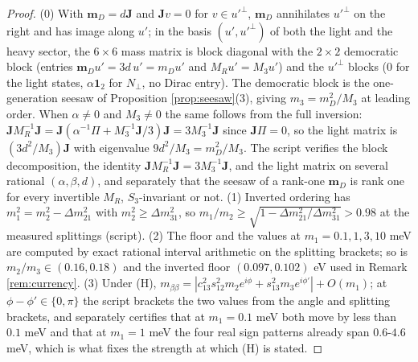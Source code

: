 \documentclass[11pt]{article}
\theoremstyle{definition}
\newcommand{\J}{\mathbf{J}}
\newcommand{\mD}{\mathbf{m}_{D}}
\begin{document}
\begin{proof}
(0) With $\mD = d\J$ and $\J v = 0$ for $v \in u'^{\perp}$, $\mD$ annihilates $u'^{\perp}$ on the right and has image along $u'$; in the basis $(u', u'^{\perp})$ of both the light and the heavy sector, the $6 \times 6$ mass matrix is block diagonal with the $2 \times 2$ democratic block (entries $\mD u' = 3d\,u' = m_{D}u'$ and $M_{R}u' = M_{3}u'$) and the $u'^{\perp}$ blocks ($0$ for the light states, $\alpha\mathbf{1}_{2}$ for $N_{\perp}$, no Dirac entry). The democratic block is the one-generation seesaw of Proposition \ref{prop:seesaw}(3), giving $m_{3} = m_{D}^{2}/M_{3}$ at leading order. When $\alpha \neq 0$ and $M_{3} \neq 0$ the same follows from the full inversion: $\J M_{R}^{-1}\J = \J(\alpha^{-1}\Pi + M_{3}^{-1}\J/3)\J = 3M_{3}^{-1}\J$ since $\J\Pi = 0$, so the light matrix is $(3d^{2}/M_{3})\J$ with eigenvalue $9d^{2}/M_{3} = m_{D}^{2}/M_{3}$. The script verifies the block decomposition, the identity $\J M_{R}^{-1}\J = 3M_{3}^{-1}\J$, and the light matrix on several rational $(\alpha, \beta, d)$, and separately that the seesaw of a rank-one $\mD$ is rank one for every invertible $M_{R}$, $S_{3}$-invariant or not. (1) Inverted ordering has $m_{1}^{2} = m_{2}^{2} - \Delta m^{2}_{21}$ with $m_{2}^{2} \ge \Delta m^{2}_{31}$, so $m_{1}/m_{2} \ge \sqrt{1 - \Delta m^{2}_{21}/\Delta m^{2}_{31}} > 0.98$ at the measured splittings (script). (2) The floor and the values at $m_{1} = 0.1, 1, 3, 10$ meV are computed by exact rational interval arithmetic on the splitting brackets; so is $m_{2}/m_{3} \in (0.16, 0.18)$ and the inverted floor $(0.097, 0.102)$ eV used in Remark \ref{rem:currency}. (3) Under (H), $m_{\beta\beta} = |c_{13}^{2}s_{12}^{2}m_{2}e^{i\phi} + s_{13}^{2}m_{3}e^{i\phi'}| + O(m_{1})$; at $\phi - \phi' \in \{0, \pi\}$ the script brackets the two values from the angle and splitting brackets, and separately certifies that at $m_{1} = 0.1$ meV both move by less than $0.1$ meV and that at $m_{1} = 1$ meV the four real sign patterns already span $0.6$-$4.6$ meV, which is what fixes the strength at which (H) is stated.
\end{proof}
\end{document}
